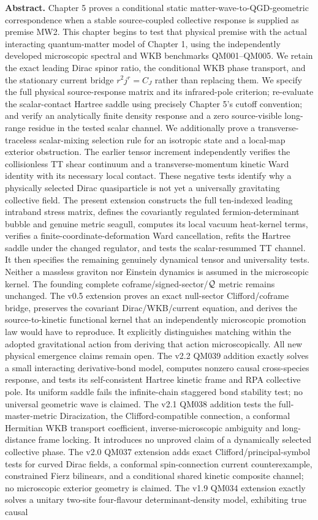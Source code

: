 \documentclass[11pt,a4paper]{article}
\begin{document}
\textbf{Abstract.} Chapter 5 proves a conditional static matter-wave-to-QGD-geometric correspondence when a stable source-coupled collective response is supplied as premise MW2. This chapter begins to test that physical premise with the actual interacting quantum-matter model of Chapter 1, using the independently developed microscopic spectral and WKB benchmarks QM001--QM005. We retain the exact leading Dirac spinor ratio, the conditional WKB phase transport, and the stationary current bridge $r^2j^r=C_J$ rather than replacing them. We specify the full physical source-response matrix and its infrared-pole criterion; re-evaluate the scalar-contact Hartree saddle using precisely Chapter 5's cutoff convention; and verify an analytically finite density response and a zero source-visible long-range residue in the tested scalar channel. We additionally prove a transverse-traceless scalar-mixing selection rule for an isotropic state and a local-map exterior obstruction. The earlier tensor increment independently verifies the collisionless TT shear continuum and a transverse-momentum kinetic Ward identity with its necessary local contact. These negative tests identify why a physically selected Dirac quasiparticle is not yet a universally gravitating collective field. The present extension constructs the full ten-indexed leading intraband stress matrix, defines the covariantly regulated fermion-determinant bubble and genuine metric seagull, computes its local vacuum heat-kernel terms, verifies a finite-coordinate-deformation Ward cancellation, refits the Hartree saddle under the changed regulator, and tests the scalar-resummed TT channel. It then specifies the remaining genuinely dynamical tensor and universality tests. Neither a massless graviton nor Einstein dynamics is assumed in the microscopic kernel. The founding complete coframe/signed-sector/$\mathcal Q$ metric remains unchanged. The v0.5 extension proves an exact null-sector Clifford/coframe bridge, preserves the covariant Dirac/WKB/current equation, and derives the source-to-kinetic functional kernel that an independently microscopic promotion law would have to reproduce. It explicitly distinguishes matching within the adopted gravitational action from deriving that action microscopically. All new physical emergence claims remain open. The v2.2 QM039 addition exactly solves a small interacting derivative-bond model, computes nonzero causal cross-species response, and tests its self-consistent Hartree kinetic frame and RPA collective pole. Its uniform saddle fails the infinite-chain staggered bond stability test; no universal geometric wave is claimed. The v2.1 QM038 addition tests the full-master-metric Diracization, the Clifford-compatible connection, a conformal Hermitian WKB transport coefficient, inverse-microscopic ambiguity and long-distance frame locking. It introduces no unproved claim of a dynamically selected collective phase. The v2.0 QM037 extension adds exact Clifford/principal-symbol tests for curved Dirac fields, a conformal spin-connection current counterexample, constrained Fierz bilinears, and a conditional shared kinetic composite channel; no microscopic exterior geometry is claimed. The v1.9 QM034 extension exactly solves a unitary two-site four-flavour determinant-density model, exhibiting true causal 
\end{document}
